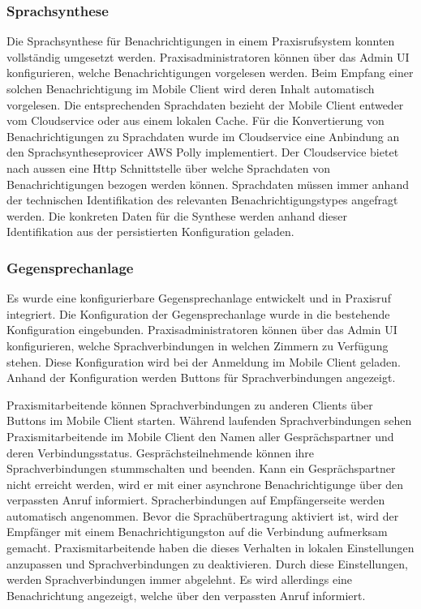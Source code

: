 \clearpage

\subsubsection{Sprachsynthese}

Die Sprachsynthese für Benachrichtigungen in einem Praxisrufsystem konnten vollständig umgesetzt werden.
Praxisadministratoren können über das Admin UI konfigurieren, welche Benachrichtigungen vorgelesen werden.
Beim Empfang einer solchen Benachrichtigung im Mobile Client wird deren Inhalt automatisch vorgelesen.
Die entsprechenden Sprachdaten bezieht der Mobile Client entweder vom Cloudservice oder aus einem lokalen Cache.
Für die Konvertierung von Benachrichtigungen zu Sprachdaten wurde im Cloudservice eine Anbindung an den Sprachsyntheseprovicer AWS Polly implementiert.
Der Cloudservice bietet nach aussen eine Http Schnittstelle über welche Sprachdaten von Benachrichtigungen bezogen werden können.
Sprachdaten müssen immer anhand der technischen Identifikation des relevanten Benachrichtigungstypes angefragt werden.
Die konkreten Daten für die Synthese werden anhand dieser Identifikation aus der persistierten Konfiguration geladen.

\clearpage

\subsubsection{Gegensprechanlage}

Es wurde eine konfigurierbare Gegensprechanlage entwickelt und in Praxisruf integriert.
Die Konfiguration der Gegensprechanlage wurde in die bestehende Konfiguration eingebunden.
Praxisadministratoren können über das Admin UI konfigurieren, welche Sprachverbindungen in welchen Zimmern zu Verfügung stehen.
Diese Konfiguration wird bei der Anmeldung im Mobile Client geladen.
Anhand der Konfiguration werden Buttons für Sprachverbindungen angezeigt.

Praxismitarbeitende können Sprachverbindungen zu anderen Clients über Buttons im Mobile Client starten.
Während laufenden Sprachverbindungen sehen Praxismitarbeitende im Mobile Client den Namen aller Gesprächspartner und deren Verbindungsstatus.
Gesprächsteilnehmende können ihre Sprachverbindungen stummschalten und beenden.
Kann ein Gesprächspartner nicht erreicht werden, wird er mit einer asynchrone Benachrichtigunge über den verpassten Anruf informiert.
Spracherbindungen auf Empfängerseite werden automatisch angenommen.
Bevor die Sprachübertragung aktiviert ist, wird der Empfänger mit einem Benachrichtigungston auf die Verbindung aufmerksam gemacht.
Praxismitarbeitende haben die dieses Verhalten in lokalen Einstellungen anzupassen und Sprachverbindungen zu deaktivieren.
Durch diese Einstellungen, werden Sprachverbindungen immer abgelehnt.
Es wird allerdings eine Benachrichtung angezeigt, welche über den verpassten Anruf informiert.

